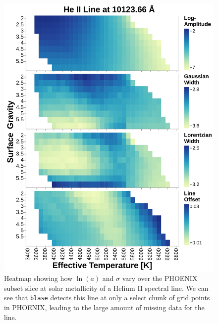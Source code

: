 \documentclass[twocolumn]{aastex631}
\begin{document}
\begin{figure}
    \centering
    \includegraphics[width=\textwidth]{figure4}
    \caption{Heatmap showing how $\ln(a)$ and $\sigma$ vary over the PHOENIX subset slice at solar metallicity of a Helium II spectral line.
    We can see that \texttt{blase} detects this line at only a select chunk of grid points in PHOENIX, leading to the large amount of missing data for the line.}
    \label{fig:figure4}
\end{figure}
\end{document}
